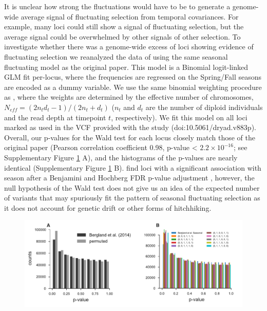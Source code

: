 \documentclass[11pt]{article}
\begin{document}
{\begin{figure}[!ht]
  \label{suppfig:bergland-pvalue-comparison}
\end{figure}


It is unclear how strong the fluctuations would have to be to generate a
genome-wide average signal of fluctuating selection from temporal covariances.
For example, many loci could still show a signal of fluctuating selection, but
the average signal could be overwhelmed by other signals of other selection. To
investigate whether there was a genome-wide excess of loci showing evidence of
fluctuating selection we reanalyzed the data of \parencite{Bergland2014-ij}
using the same seasonal fluctuating model as the original paper. This model is
a Binomial logit-linked GLM fit per-locus, where the frequencies are regressed
on the Spring/Fall seasons are encoded as a dummy variable. We use the same
binomial weighting procedure as \textcite{Bergland2014-ij}, where the weights
are determined by the effective number of chromosomes, $N_{eff} = (2 n_t d_t -
1) / (2 n_t + d_t)$ ($n_t$ and $d_t$ are the number of diploid individuals and
the read depth at timepoint $t$, respectively). We fit this model on all loci
marked as used in the VCF provided with the \textcite{Bergland2014-ij} study
(doi:10.5061/dryad.v883p). Overall, our p-values for the Wald test for each
locus closely match those of the original paper (Pearson correlation
coefficient 0.98, p-value < $2.2 \times 10^{-16}$; see Supplementary Figure
\ref{suppfig:bergland-pvalue-comparison} A), and the histograms of the p-values
are nearly identical (Supplementary Figure
\ref{suppfig:bergland-pvalue-comparison} B). \textcite{Bergland2014-ij} find
loci with a significant association with season after a Benjamini and Hochberg
FDR p-value adjustment \parencite{Benjamini1995-jy}, however, the null
hypothesis of the Wald test does not give us an idea of the expected number of
variants that may spuriously fit the pattern of seasonal fluctuating selection
as it does not account for genetic drift or other forms of hitchhiking.

\begin{figure}[!ht]
  \centering
  \includegraphics[width=\textwidth]{figures/bergland-combined-hists.pdf}


\end{figure}}
\end{document}
